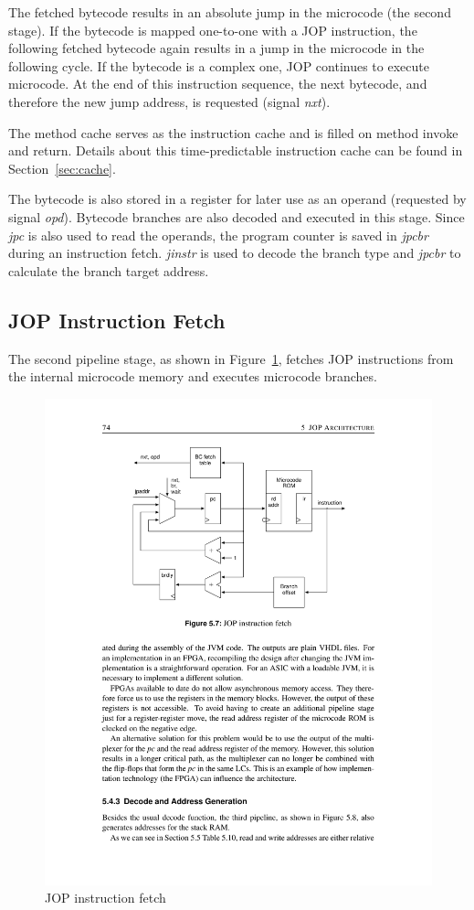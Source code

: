 The fetched bytecode results in an absolute jump in the microcode
(the second stage). If the bytecode is mapped one-to-one with a JOP
instruction, the following fetched bytecode again results in a jump
in the microcode in the following cycle. If the bytecode is a complex
one, JOP continues to execute microcode. At the end of this
instruction sequence, the next bytecode, and therefore the new jump
address, is requested (signal \emph{nxt}).

The method cache serves as the instruction cache and is filled on
method invoke and return. Details about this time-predictable
instruction cache can be found in Section~\ref{sec:cache}.

The bytecode is also stored in a register for later use as an
operand (requested by signal \emph{opd}). Bytecode branches are also
decoded and executed in this stage. Since \emph{jpc} is also used to
read the operands, the program counter is saved in \emph{jpcbr}
during an instruction fetch. \emph{jinstr} is used to decode the
branch type and \emph{jpcbr} to calculate the branch target address.

\subsection{JOP Instruction Fetch}

The second pipeline stage, as shown in Figure~\ref{fig_arch_fetch},
fetches JOP instructions from the internal microcode memory and
executes microcode branches.

\begin{figure}
    \centering
    \includegraphics[scale=\picscale]{arch/arch_fetch}
    \caption{JOP instruction fetch}
    \label{fig_arch_fetch}
\end{figure}

